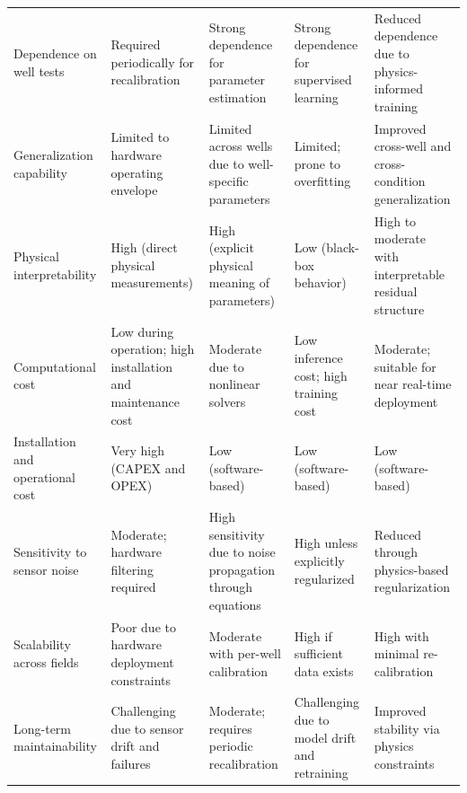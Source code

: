 \documentclass[12pt,APA]{uomthesis}
\begin{document}
\begin{longtable}{p{2cm} Z Z Z Z}
Dependence on well tests 
& Required periodically for recalibration 
& Strong dependence for parameter estimation 
& Strong dependence for supervised learning 
& Reduced dependence due to physics-informed training \\

Generalization capability 
& Limited to hardware operating envelope 
& Limited across wells due to well-specific parameters 
& Limited; prone to overfitting 
& Improved cross-well and cross-condition generalization \\

Physical interpretability 
& High (direct physical measurements) 
& High (explicit physical meaning of parameters) 
& Low (black-box behavior) 
& High to moderate with interpretable residual structure \\

Computational cost 
& Low during operation; high installation and maintenance cost 
& Moderate due to nonlinear solvers 
& Low inference cost; high training cost 
& Moderate; suitable for near real-time deployment \\

Installation and operational cost 
& Very high (CAPEX and OPEX) 
& Low (software-based) 
& Low (software-based) 
& Low (software-based) \\

Sensitivity to sensor noise 
& Moderate; hardware filtering required 
& High sensitivity due to noise propagation through equations 
& High unless explicitly regularized 
& Reduced through physics-based regularization \\

Scalability across fields 
& Poor due to hardware deployment constraints 
& Moderate with per-well calibration 
& High if sufficient data exists 
& High with minimal re-calibration \\

Long-term maintainability 
& Challenging due to sensor drift and failures 
& Moderate; requires periodic recalibration 
& Challenging due to model drift and retraining 
& Improved stability via physics constraints \\

\end{longtable}
\end{document}
